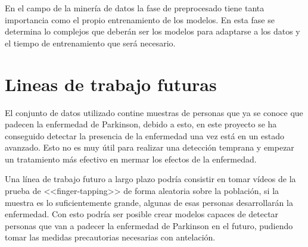 \label{cha:Conclusiones y Líneas de trabajo futuras}

En el campo de la minería de datos la fase de preprocesado tiene tanta
importancia como el propio entrenamiento de los modelos. En esta fase se
determina lo complejos que deberán ser los modelos para adaptarse a los datos y
el tiempo de entrenamiento que será necesario.

\section{Lineas de trabajo futuras}

El conjunto de datos utilizado contine muestras de personas que ya se conoce que
padecen la enfermedad de Parkinson, debido a esto, en este proyecto se ha
conseguido detectar la presencia de la enfermedad una vez está en un estado
avanzado. Esto no es muy útil para realizar una detección temprana y empezar un
tratamiento más efectivo en mermar los efectos de la enfermedad.

Una línea de trabajo futuro a largo plazo podría consistir en tomar vídeos de la
prueba de <<finger-tapping>> de forma aleatoria sobre la población, si la
muestra es lo suficientemente grande, algunas de esas personas desarrollarán la
enfermedad. Con esto podría ser posible crear modelos capaces de detectar
personas que van a padecer la enfermedad de Parkinson en el futuro, pudiendo
tomar las medidas precautorias necesarias con antelación.
